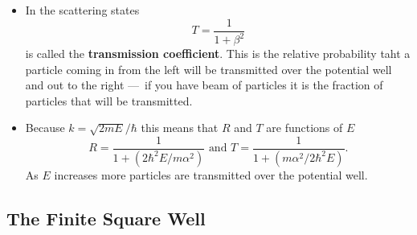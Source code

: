 \documentclass{article}
\begin{document}
\begin{itemize}
  \item In the scattering states \[T = \frac{1}{1 + \beta^2}\] is called the \textbf{transmission coefficient}. This is the relative probability taht a particle coming in from the left will be transmitted over the potential well and out to the right — if you have beam of particles it is the fraction of particles that will be transmitted.

  \item Because $k = \sqrt{2 m E} / \hbar$ this means that $R$ and $T$ are functions of $E$ \[R = \frac{1}{1 + (2 \hbar^2 E / m \alpha^2)} \text{ and } T = \frac{1}{1 + (m \alpha^2 / 2 \hbar^2 E)}.\] As $E$ increases more particles are transmitted over the potential well.
\end{itemize}

\subsection{The Finite Square Well}
\end{document}
